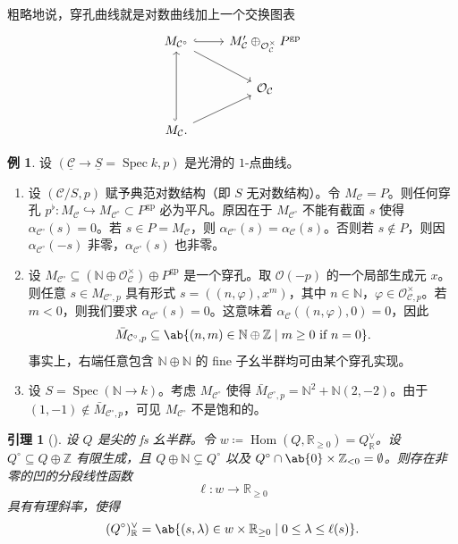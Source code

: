 \documentclass{amsart}
\newtheorem{lem}[thm]{引理}
\theoremstyle{definition}
\newtheorem{exm}[thm]{例}
\theoremstyle{remark}
\theoremstyle{plain}
\theoremstyle{definition}
\theoremstyle{remark}
\newcommand{\N}{\mathbb{N}}
\newcommand{\R}{\mathbb{R}}
\newcommand{\Z}{\mathbb{Z}}
\newcommand{\mc}[1]{\mathcal{#1}}
\newcommand{\on}[1]{\operatorname{#1}}
\newcommand{\ul}[1]{\underline{#1}}
\newcommand{\1}{\mathbf{1}}
\newcommand{\2}{\mathbf{2}}
\newcommand{\3}{\mathbf{3}}
\DeclareMathOperator{\Hom}{Hom}
\DeclareMathOperator{\Spec}{Spec}
\begin{document}
粗略地说，穿孔曲线就是对数曲线加上一个交换图表
\begin{equation*}
\begin{tikzcd}
    M_{\mc{C}^{\circ}} \ar{dr} \ar[hookrightarrow]{r} & M_{\mc{C}}' \oplus_{\mc{O}_{\mc{C}}^{\times}} P^{\on{gp}} \\
    & \mc{O}_{\mc{C}} \\
    M_{\mc{C}} \ar[hookrightarrow]{uu} \ar{ur}.
\end{tikzcd}
\end{equation*}


\begin{exm}
    设 \((\ul{\mc{C}} \to \ul{S} = \Spec k, p)\) 是光滑的 \(1\)-点曲线。
    \begin{enumerate}
        \item 设 \((\mc{C}/S, p)\) 赋予典范对数结构（即 \(S\) 无对数结构）。令 \(M_{\mc{C}} = P\)。则任何穿孔 \(p^{\flat} \colon M_{\mc{C}} \hookrightarrow M_{\mc{C}^{\circ}} \subset P^{\on{gp}}\) 必为平凡。原因在于 \(M_{\mc{C}^{\circ}}\) 不能有截面 \(s\) 使得 \(\alpha_{\mc{C}^{\circ}}(s) = 0\)。若 \(s \in P = M_{\mc{C}}\)，则 \(\alpha_{\mc{C}^{\circ}}(s) = \alpha_{\mc{C}}(s)\)。否则若 \(s \notin P\)，则因 \(\alpha_{\mc{C}^{\circ}}(-s)\) 非零，\(\alpha_{\mc{C}^{\circ}}(s)\) 也非零。
        \item 设 \(M_{\mc{C}^{\circ}} \subseteq (\N \oplus \mc{O}_{\mc{C}}^{\times}) \oplus P^{\on{gp}}\) 是一个穿孔。取 \(\mc{O}(-p)\) 的一个局部生成元 \(x\)。则任意 \(s \in M_{\mc{C}^{\circ}, p}\) 具有形式 \(s = ((n, \varphi), x^m)\)，其中 \(n \in \N\)，\(\varphi \in \mc{O}_{\mc{C}, p}^{\times}\)。若 \(m < 0\)，则我们要求 \(\alpha_{\mc{C}^{\circ}}(s) = 0\)。这意味着 \(\alpha_{\mc{C}}((n, \varphi), 0) = 0\)，因此
            \[ \bar{M}_{\mc{C}^{\circ}, p} \subseteq \ab\{(n, m) \in \N \oplus \Z \mid m \geq 0 \text{ if } n = 0 \}. \]
            事实上，右端任意包含 \(\N \oplus \N\) 的 fine 子幺半群均可由某个穿孔实现。
        \item 设 \(S = \Spec(\N \to k)\)。考虑 \(M_{\mc{C}^{\circ}}\) 使得 \(\bar{M}_{\mc{C}^{\circ}, p} = \N^2 + \N (2,-2)\)。由于 \((1,-1) \notin \bar{M}_{\mc{C}^{\circ}, p}\)，可见 \(M_{\mc{C}^{\circ}}\) 不是饱和的。
    \end{enumerate}
\end{exm}

\begin{lem}[{\cite{ACGS2025}}]
    设 \(Q\) 是尖的 fs 幺半群。令 \(w \coloneqq \Hom(Q, \R_{\geq 0}) = Q_{\R}^{\vee}\)。设 \(Q^{\circ} \subseteq Q \oplus \Z\) 有限生成，且 \(Q \oplus \N \subsetneq Q^{\circ}\) 以及 \(Q^{\circ} \cap \ab\{0\} \times \Z_{<0} = \emptyset\)。则存在非零的凹的分段线性函数
    \[ \ell \colon w \to \R_{\geq 0} \]
    具有有理斜率，使得
    \[ (Q^{\circ})_{\R}^{\vee} = \ab\{ (s, \lambda) \in w \times \R_{\geq 0} \mid 0 \leq \lambda \leq \ell(s) \}. \]
\end{lem}
\end{document}
